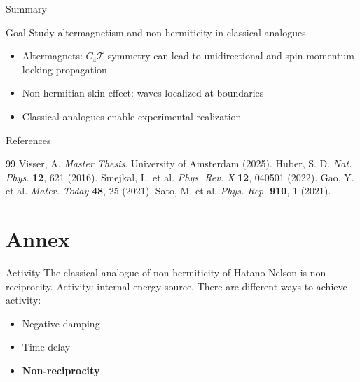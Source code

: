 \documentclass[usepdftitle=false]{beamer}
\begin{document}
\begin{frame}{Summary}
    \begin{alertblock}{Goal}
        Study altermagnetism and non-hermiticity in classical analogues 
    \end{alertblock}
    \vfill
    \begin{itemize}
        \item Altermagnets: $C_4\mathcal{T}$ symmetry can lead to unidirectional and spin-momentum locking propagation \vfill
        \item Non-hermitian skin effect: waves localized at boundaries \vfill
        \item Classical analogues enable experimental realization
    \end{itemize}
\end{frame}

\begin{frame}{References}
    \footnotesize
\begin{thebibliography}{99}
 Visser, A. \textit{Master Thesis}. University of Amsterdam (2025).
 Huber, S. D. \textit{Nat. Phys.} \textbf{12}, 621 (2016).
 Smejkal, L. et al. \textit{Phys. Rev. X} \textbf{12}, 040501 (2022).
 Gao, Y. et al. \textit{Mater. Today} \textbf{48}, 25 (2021).
 Sato, M. et al. \textit{Phys. Rep.} \textbf{910}, 1 (2021).
\end{thebibliography}
\end{frame}

\section*{Annex}

\begin{frame}[noframenumbering]{Activity}
    The classical analogue of non-hermiticity of Hatano-Nelson is non-reciprocity. \pause
    \vfill
    Activity: internal energy source. \pause 
    \vfill
    There are different ways to achieve activity:  \pause
    \begin{itemize}
        \item Negative damping \pause
        \item Time delay \pause 
        \item \textbf{Non-reciprocity}
    \end{itemize}
\end{frame}

\end{document}
